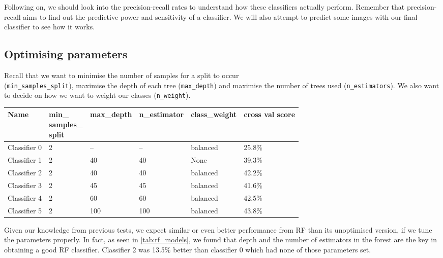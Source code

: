 Following on, we should look into the precision-recall rates to understand how these classifiers actually perform. Remember that precision-recall aims to find out the predictive power and sensitivity of a classifier. We will also attempt to predict some images with our final classifier to see how it works.

\subsection*{Optimising parameters}
Recall that we want to minimise the number of samples for a split to occur \\(\texttt{min{\_}samples{\_}split}), maximise the depth of each tree (\texttt{max{\_}depth}) and maximise the number of trees used (\texttt{n{\_}estimators}). We also want to decide on how we want to weight our classes (\texttt{n{\_}weight}).

\vspace{15pt}
\parbox{\linewidth} {
	\centering
  \begin{tabular}{|M{0.14\textwidth}|M{0.12\textwidth}|M{0.15\textwidth}|M{0.15\textwidth}|M{0.15\textwidth}|M{0.11\textwidth}|}
		\hline 
    \textbf{Name} & 
    \textbf{min{\_}\newline samples{\_}\newline split} & 
    \textbf{max{\_}depth} & 
    \textbf{n{\_}estimator} & 
    \textbf{class{\_}weight} &
    \textbf{cross val score}
		\\ \hline 
    Classifier 0 & 2 & --  & --  & balanced & 25.8\%
		\\ \hline
    Classifier 1 & 2 & 40  & 40  & None     & 39.3\%
		\\ \hline
    Classifier 2 & 2 & 40  & 40  & balanced & 42.2\%
		\\ \hline
    Classifier 3 & 2 & 45  & 45  & balanced & 41.6\%
		\\ \hline
    Classifier 4 & 2 & 60  & 60  & balanced & 42.5\%
		\\ \hline
    Classifier 5 & 2 & 100 & 100 & balanced & 43.8\%
		\\ \hline
	\end{tabular}
\label{tab:rf_models}
}
\vspace{15pt}

Given our knowledge from previous tests, we expect similar or even better performance from RF than its unoptimised version, if we tune the parameters properly. In fact, as seen in \autoref{tab:rf_models}, we found that depth and the number of estimators in the forest are the key in obtaining a good RF classifier. Classifier 2 was 13.5\% better than classifier 0 which had none of those parameters set. 

